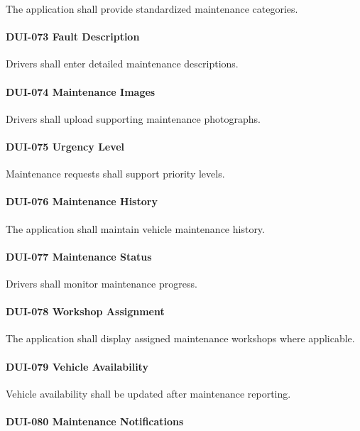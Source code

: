 The application shall provide standardized maintenance categories.

\paragraph{DUI-073 Fault Description}

Drivers shall enter detailed maintenance descriptions.

\paragraph{DUI-074 Maintenance Images}

Drivers shall upload supporting maintenance photographs.

\paragraph{DUI-075 Urgency Level}

Maintenance requests shall support priority levels.

\paragraph{DUI-076 Maintenance History}

The application shall maintain vehicle maintenance history.

\paragraph{DUI-077 Maintenance Status}

Drivers shall monitor maintenance progress.

\paragraph{DUI-078 Workshop Assignment}

The application shall display assigned maintenance workshops where
applicable.

\paragraph{DUI-079 Vehicle Availability}

Vehicle availability shall be updated after maintenance reporting.

\paragraph{DUI-080 Maintenance Notifications}

